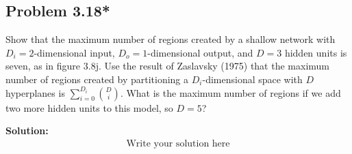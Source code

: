 \documentclass{article}
\begin{document}
    \subsection*{Problem 3.18*}
    Show that the maximum number of regions created by a shallow network with $D_i = 2$-dimensional input, $D_o = 1$-dimensional output, and $D = 3$ hidden units is seven, as in figure 3.8j. Use the result of Zaslavsky (1975) that the maximum number of regions created by partitioning a $D_i$-dimensional space with $D$ hyperplanes is $\sum_{i=0}^{D_i} \binom{D}{i}$. What is the maximum number of regions if we add two more hidden units to this model, so $D = 5$?

        \vspace{1cm}
        \textbf{Solution:}
        \begin{align*}
            \text{Write your solution here}
        \end{align*}
\end{document}
